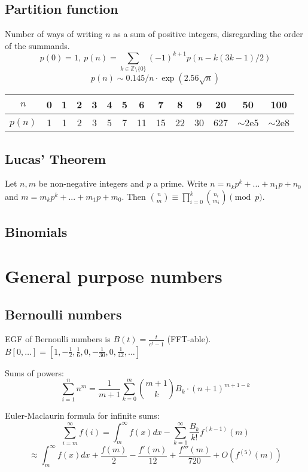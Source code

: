 \documentclass{article}
\begin{document}
	\subsection{Partition function}
		Number of ways of writing $n$ as a sum of positive integers, disregarding the order of the summands.
		\[ p(0) = 1,\ p(n) = \sum_{k \in \mathbb Z \setminus \{0\}}{(-1)^{k+1} p(n - k(3k-1) / 2)} \]
		\[ p(n) \sim 0.145 / n \cdot \exp(2.56 \sqrt{n}) \]

		\begin{center}
		\begin{tabular}{c|c@{\ }c@{\ }c@{\ }c@{\ }c@{\ }c@{\ }c@{\ }c@{\ }c@{\ }c@{\ }c@{\ }c@{\ }c}
			$n$    & 0 & 1 & 2 & 3 & 4 & 5 & 6  & 7  & 8  & 9  & 20  & 50  & 100 \\ \hline
			$p(n)$ & 1 & 1 & 2 & 3 & 5 & 7 & 11 & 15 & 22 & 30 & 627 & $\mathtt{\sim}$2e5 & $\mathtt{\sim}$2e8 \\
		\end{tabular}
		\end{center}

	\subsection{Lucas' Theorem}
		Let $n,m$ be non-negative integers and $p$ a prime. Write $n=n_kp^k+...+n_1p+n_0$ and $m=m_kp^k+...+m_1p+m_0$. Then $\binom{n}{m} \equiv \prod_{i=0}^k\binom{n_i}{m_i} \pmod{p}$.

	\subsection{Binomials}

\section{General purpose numbers}
	\subsection{Bernoulli numbers}
		EGF of Bernoulli numbers is $B(t)=\frac{t}{e^t-1}$ (FFT-able).
		$B[0,\ldots] = [1, -\frac{1}{2}, \frac{1}{6}, 0, -\frac{1}{30}, 0, \frac{1}{42}, \ldots]$

		Sums of powers:
		\small
		\[ \sum_{i=1}^n n^m = \frac{1}{m+1} \sum_{k=0}^m \binom{m+1}{k} B_k \cdot (n+1)^{m+1-k} \]
		\normalsize

		Euler-Maclaurin formula for infinite sums:
		\small
		\[ \sum_{i=m}^{\infty} f(i) = \int_m^\infty f(x) dx - \sum_{k=1}^\infty \frac{B_k}{k!}f^{(k-1)}(m) \]
		\[ \approx \int_{m}^\infty f(x)dx + \frac{f(m)}{2} - \frac{f'(m)}{12} + \frac{f'''(m)}{720} + O(f^{(5)}(m)) \]
		\normalsize
\end{document}
